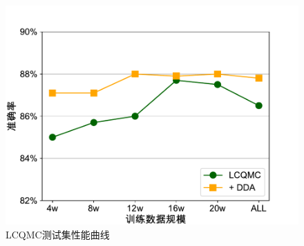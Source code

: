 \begin{figure}[h]
    \centering
      \includegraphics[scale=0.5]{figure/fig4-2.pdf}
    \caption{LCQMC测试集性能曲线}
    \label{fig4-2}
\end{figure}